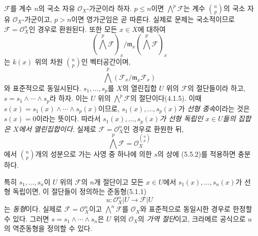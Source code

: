 \begin{env}[5.5.4]
\label{0.5.5.4-ko}
$\mathcal F$를 계수 $n$의 국소 자유 $\mathcal O_X$-가군이라 하자.
$p\leq n$이면 $\bigwedge^p\mathcal F$는 계수
$\binom{n}{p}$의 국소 자유 $\mathcal O_X$-가군이고, $p>n$이면
영가군임은 곧 따른다. 실제로 문제는 국소적이므로
$\mathcal F=\mathcal O_X^n$인 경우로 환원된다. 또한 모든 $x\in X$에
대하여
\[
  (\bigwedge^p\mathcal F)_x/
  \mathfrak m_x(\bigwedge^p\mathcal F)_x
\]
는 $k(x)$ 위의 차원 $\binom{n}{p}$인 벡터공간이며,
\[
  \bigwedge^p(\mathcal F_x/\mathfrak m_x\mathcal F_x)
\]
와 표준적으로 동일시된다. $s_1,\ldots,s_p$를 $X$의 열린집합 $U$
위의 $\mathcal F$의 절단들이라 하고,
$s=s_1\wedge\cdots\wedge s_p$라 하자. 이는 $U$ 위의
$\bigwedge^p\mathcal F$의 절단이다(4.1.5). 이때
$s(x)=s_1(x)\wedge\cdots\wedge s_p(x)$이므로,
$s_1(x),\ldots,s_p(x)$가 \emph{선형 종속}이라는 것은 $s(x)=0$이라는
뜻이다. 따라서 \emph{$s_1(x),\ldots,s_p(x)$가 선형 독립인
$x\in U$들의 집합은 $X$에서 열린집합이다.} 실제로
$\mathcal F=\mathcal O_X^n$인 경우로 환원한 뒤,
\[
  \bigwedge^p\mathcal F
  =\mathcal O_X^{\binom{n}{p}}
\]
에서 $\binom{n}{p}$개의 성분으로 가는 사영 중 하나에 의한 $s$의
상에 (5.5.2)를 적용하면 충분하다.

특히 $s_1,\ldots,s_n$이 $U$ 위의 $\mathcal F$의 $n$개 절단이고 모든
$x\in U$에서 $s_1(x),\ldots,s_n(x)$가 선형 독립이면, 이 절단들이
정의하는 준동형(5.1.1)
\[
  u:\mathcal O_X^n|U\longrightarrow\mathcal F|U
\]
는 \emph{동형}이다. 실제로
$\mathcal F=\mathcal O_X^n$이고
$\bigwedge^n\mathcal F$를 $\mathcal O_X$와 표준적으로 동일시한
경우로 한정할 수 있다. 그러면
$s=s_1\wedge\cdots\wedge s_n$은 $U$ 위의 $\mathcal O_X$의
\emph{가역 절단}이고, 크라메르 공식으로 $u$의 역준동형을 정의할 수
있다.
\end{env}


